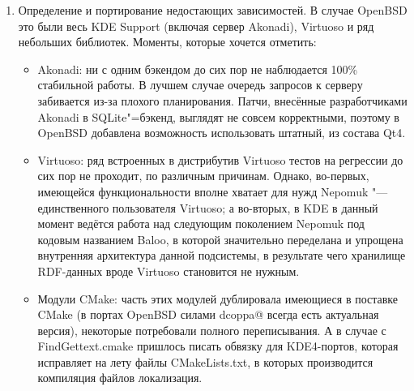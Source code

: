 \documentclass[10pt, a5paper]{article}
\begin{document}
\begin{enumerate}
 \item Определение и портирование недостающих зависимостей. В случае OpenBSD это были весь KDE Support (включая сервер Akonadi), Virtuoso и ряд небольших библиотек. Моменты, которые хочется отметить:
\begin{itemize}
 \item Akonadi: ни с одним бэкендом до сих пор не наблюдается 100\% стабильной работы. В лучшем случае очередь запросов к серверу забивается из-за плохого планирования. Патчи, внесённые разработчиками Akonadi в SQLite"=бэкенд, выглядят не совсем корректными, поэтому в OpenBSD добавлена возможность использовать штатный, из состава Qt4.
 \item Virtuoso: ряд встроенных в дистрибутив Virtuoso тестов на регрессии до сих пор не проходит, по различным причинам. Однако, во-первых, имеющейся функциональности вполне хватает для нужд Ne\-po\-muk "--- единственного пользователя Virtuoso; а во-вторых, в KDE в данный момент ведётся работа над следующим поколением Nepomuk под кодовым названием Baloo, в которой значительно переделана и упрощена внутренняя архитектура данной подсистемы, в результате чего хранилище RDF-данных вроде Virtuoso становится не нужным.
 \item Модули CMake: часть этих модулей дублировала имеющиеся в поставке CMake (в портах OpenBSD силами dcoppa@ всегда есть актуальная версия), некоторые потребовали полного переписывания. А в случае с Find\-Get\-text.cma\-ke пришлось писать обвязку для KDE4-портов, которая исправляет на лету файлы CMake\-Lists.txt, в которых производится компиляция файлов локализация.
\end{itemize}


\end{enumerate}
\end{document}
